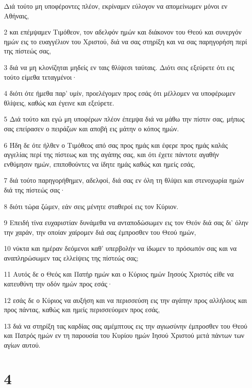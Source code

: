 \par Διά τούτο μη υποφέροντες πλέον, εκρίναμεν εύλογον να απομείνωμεν μόνοι εν Αθήναις,
\par 2 και επέμψαμεν Τιμόθεον, τον αδελφόν ημών και διάκονον του Θεού και συνεργόν ημών εις το ευαγγέλιον του Χριστού, διά να σας στηρίξη και να σας παρηγορήση περί της πίστεώς σας,
\par 3 διά να μη κλονίζηται μηδείς εν ταις θλίψεσι ταύταις. Διότι σεις εξεύρετε ότι εις τούτο είμεθα τεταγμένοι·
\par 4 διότι ότε ήμεθα παρ' υμίν, προελέγομεν προς εσάς ότι μέλλομεν να υποφέρωμεν θλίψεις, καθώς και έγεινε και εξεύρετε.
\par 5 Διά τούτο και εγώ μη υποφέρων πλέον έπεμψα διά να μάθω την πίστιν σας, μήπως σας επείρασεν ο πειράζων και αποβή εις μάτην ο κόπος ημών.
\par 6 Ήδη δε ότε ήλθεν ο Τιμόθεος από σας προς ημάς και έφερε προς ημάς καλάς αγγελίας περί της πίστεως και της αγάπης σας, και ότι έχετε πάντοτε αγαθήν ενθύμησιν ημών, επιποθούντες να ίδητε ημάς καθώς και ημείς εσάς,
\par 7 διά τούτο παρηγορήθημεν, αδελφοί, διά σας εν όλη τη θλίψει και στενοχωρία ημών διά της πίστεώς σας·
\par 8 διότι τώρα ζώμεν, εάν σεις μένητε σταθεροί εις τον Κύριον.
\par 9 Επειδή τίνα ευχαριστίαν δυνάμεθα να ανταποδώσωμεν εις τον Θεόν διά σας δι' όλην την χαράν, την οποίαν χαίρομεν διά σας έμπροσθεν του Θεού ημών,
\par 10 νύκτα και ημέραν δεόμενοι καθ' υπερβολήν να ίδωμεν το πρόσωπόν σας και να αναπληρώσωμεν τας ελλείψεις της πίστεώς σας;
\par 11 Αυτός δε ο Θεός και Πατήρ ημών και ο Κύριος ημών Ιησούς Χριστός είθε να κατευθύνη την οδόν ημών προς εσάς·
\par 12 εσάς δε ο Κύριος να αυξήση και να περισσεύση εις την αγάπην προς αλλήλους και προς πάντας, καθώς και ημείς περισσεύομεν προς εσάς,
\par 13 διά να στηρίξη τας καρδίας σας αμέμπτους εις την αγιωσύνην έμπροσθεν του Θεού και Πατρός ημών εν τη παρουσία του Κυρίου ημών Ιησού Χριστού μετά πάντων των αγίων αυτού.

\chapter{4}

